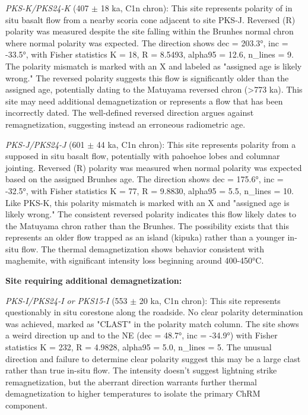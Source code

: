 \documentclass[twocolumn,11pt]{article}
\begin{document}
\textit{PKS-K/PKS24-K} (407 $\pm$ 18 ka, C1n chron): This site represents polarity of in situ basalt flow from a nearby scoria cone adjacent to site PKS-J. Reversed (R) polarity was measured despite the site falling within the Brunhes normal chron where normal polarity was expected. The direction shows dec = 203.3°, inc = -33.5°, with Fisher statistics K = 18, R = 8.5493, alpha95 = 12.6, n\_lines = 9. The polarity mismatch is marked with an X and labeled as "assigned age is likely wrong." The reversed polarity suggests this flow is significantly older than the assigned age, potentially dating to the Matuyama reversed chron (>773 ka). This site may need additional demagnetization or represents a flow that has been incorrectly dated. The well-defined reversed direction argues against remagnetization, suggesting instead an erroneous radiometric age.

\textit{PKS-J/PKS24-J} (601 $\pm$ 44 ka, C1n chron): This site represents polarity from a supposed in situ basalt flow, potentially with pahoehoe lobes and columnar jointing. Reversed (R) polarity was measured when normal polarity was expected based on the assigned Brunhes age. The direction shows dec = 175.6°, inc = -32.5°, with Fisher statistics K = 77, R = 9.8830, alpha95 = 5.5, n\_lines = 10. Like PKS-K, this polarity mismatch is marked with an X and "assigned age is likely wrong." The consistent reversed polarity indicates this flow likely dates to the Matuyama chron rather than the Brunhes. The possibility exists that this represents an older flow trapped as an island (kipuka) rather than a younger in-situ flow. The thermal demagnetization shows behavior consistent with maghemite, with significant intensity loss beginning around 400-450°C.

\textbf{Site requiring additional demagnetization:}

\textit{PKS-I/PKS24-I or PKS15-I} (553 $\pm$ 20 ka, C1n chron): This site represents questionably in situ corestone along the roadside. No clear polarity determination was achieved, marked as "CLAST" in the polarity match column. The site shows a weird direction up and to the NE (dec = 48.7°, inc = -34.9°) with Fisher statistics K = 232, R = 4.9828, alpha95 = 5.0, n\_lines = 5. The unusual direction and failure to determine clear polarity suggest this may be a large clast rather than true in-situ flow. The intensity doesn't suggest lightning strike remagnetization, but the aberrant direction warrants further thermal demagnetization to higher temperatures to isolate the primary ChRM component.
\end{document}
